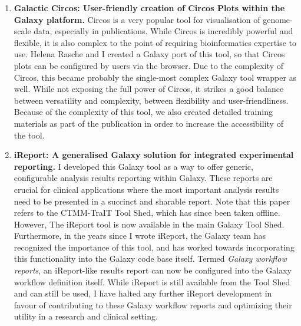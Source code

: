 \begin{enumerate}[label=\ref{chapter:general}.\arabic*]
\item \textbf{Galactic Circos: User-friendly creation of Circos Plots within the Galaxy platform.} Circos is a very popular tool for visualisation of genome-scale data, especially in publications. While Circos is incredibly powerful and flexible, it is also complex to the point of requiring bioinformatics expertise to use. Helena Rasche and I created a Galaxy port of this tool, so that Circos plots can be configured by users via the browser. Due to the complexity of Circos, this became probably the single-most complex Galaxy tool wrapper as well. While not exposing the full power of Circos, it strikes a good balance between versatility and complexity, between flexibility and user-friendliness. Because of the complexity of this tool, we also created detailed training materials as part of the publication in order to increase the accessibility of the tool.


\item \textbf{iReport: A generalised Galaxy solution for integrated experimental reporting.} I developed this Galaxy tool as a way to offer generic, configurable analysis results reporting within Galaxy. These reports are crucial for clinical applications where the most important analysis results need to be presented in a succinct and sharable report. Note that this paper refers to the CTMM-TraIT Tool Shed, which has since been taken offline. However, The iReport tool is now available in the main Galaxy Tool Shed. Furthermore, in the years since I wrote iReport, the Galaxy team has recognized the importance of this tool, and has worked towards incorporating this functionality into the Galaxy code base itself. Termed \emph{Galaxy workflow reports}, an iReport-like results report can now be configured into the Galaxy workflow definition itself. While iReport is still available from the Tool Shed and can still be used, I have halted any further iReport development in favour of contributing to these Galaxy workflow reports and optimizing their utility in a research and clinical setting.
\end{enumerate}



